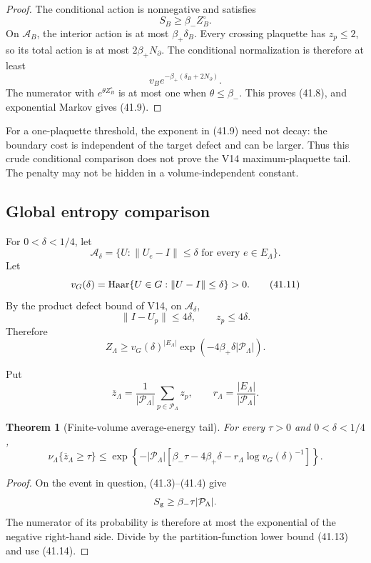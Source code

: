 \documentclass[11pt]{article}
\newtheorem{theorem}{Theorem}[section]
\begin{document}
\begin{proof}
The conditional action is nonnegative and satisfies
\[
 S_B\geq\beta_-Z_B^\circ.
\]
On \(\mathcal A_B\), the interior action is at most
\(\beta_+\delta_B\).  Every crossing plaquette has \(z_p\leq2\), so its
total action is at most \(2\beta_+N_\partial\).  The conditional
normalization is therefore at least
\[
 v_Be^{-\beta_+(\delta_B+2N_\partial)}.
\]
The numerator with \(e^{\theta Z_B^\circ}\) is at most one when
\(\theta\leq\beta_-\).  This proves (41.8), and exponential Markov gives
(41.9).
\end{proof}

For a one-plaquette threshold, the exponent in (41.9) need not decay:
the boundary cost is independent of the target defect and can be
larger.  Thus this crude conditional comparison does not prove the V14
maximum-plaquette tail.  The penalty may not be hidden in a
volume-independent constant.

\subsection{Global entropy comparison}

For \(0<\delta<1/4\), let
\[
 \mathcal A_\delta
 =
 \{U:\|U_e-I\|\leq\delta
       \text{ for every }e\in E_\Lambda\}.
 \tag{41.10}
\]
Let
\[
 v_G(\delta)
 =
 {\rm Haar}\{U\in G:\|U-I\|\leq\delta\}>0.
 \tag{41.11}
\]
By the product defect bound of V14, on \(\mathcal A_\delta\),
\[
 \|I-U_p\|\leq4\delta,
 \qquad
 z_p\leq4\delta.
 \tag{41.12}
\]
Therefore
\[
 Z_\Lambda
 \geq
 v_G(\delta)^{|E_\Lambda|}
 \exp\left(
 -4\beta_+\delta|\mathcal P_\Lambda|
 \right).
 \tag{41.13}
\]

Put
\[
 \overline z_\Lambda
 =
 \frac1{|\mathcal P_\Lambda|}
 \sum_{p\in\mathcal P_\Lambda}z_p,
 \qquad
 r_\Lambda=\frac{|E_\Lambda|}{|\mathcal P_\Lambda|}.
 \tag{41.14}
\]

\begin{theorem}[Finite-volume average-energy tail]
\label{thm:v11v41-average-tail}
For every \(\tau>0\) and \(0<\delta<1/4\),
\[
 \nu_\Lambda\{\overline z_\Lambda\geq\tau\}
 \leq
 \exp\left\{
 -|\mathcal P_\Lambda|
 \left[
 \beta_-\tau
 -4\beta_+\delta
 -r_\Lambda\log v_G(\delta)^{-1}
 \right]
 \right\}.
 \tag{41.15}
\]
\end{theorem}

\begin{proof}
On the event in question, (41.3)--(41.4) give
\[
 S_{\rm g}\geq
 \beta_-\tau|\mathcal P_\Lambda|.
\]
The numerator of its probability is therefore at most the exponential
of the negative right-hand side.  Divide by the partition-function
lower bound (41.13) and use (41.14).
\end{proof}
\end{document}
